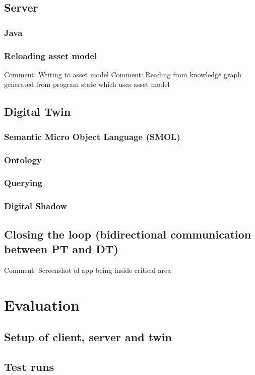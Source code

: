 \documentclass{article}
\begin{document}
\subsection{Server}
\subsubsection{Java}
\subsubsection{Reloading asset model}
Comment: Writing to asset model
Comment: Reading from knowledge graph generated from program state which uses asset model


\subsection{Digital Twin}
\subsubsection{Semantic Micro Object Language (SMOL)}
\subsubsection{Ontology}
\subsubsection{Querying}
\subsubsection{Digital Shadow}



\subsection{Closing the loop (bidirectional communication between PT and DT)}
Comment: Screenshot of app being inside critical area




\newpage
\section{Evaluation}\label{sec:Evaluation}
\subsection{Setup of client, server and twin}
\subsection{Test runs}
\end{document}
